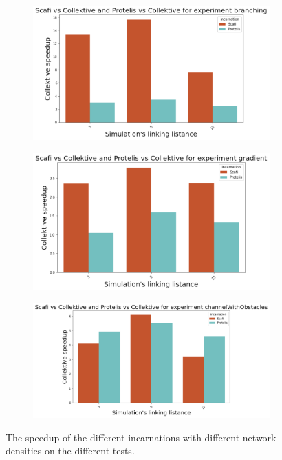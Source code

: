 \begin{figure}[ht!]
\begin{subfigure}[b]{0.49\textwidth}
        \centering
        \includegraphics[width=\textwidth]{figures/branching-speedup}
    \end{subfigure}
    \begin{subfigure}[b]{0.49\textwidth}
        \centering
        \includegraphics[width=\textwidth]{figures/gradient-speedup}
    \end{subfigure}
    \begin{subfigure}[b]{0.6\textwidth}
        \centering
        \includegraphics[width=\textwidth]{figures/channel-speedup}
    \end{subfigure}
    \caption{The speedup of the different incarnations with different network densities on the different tests.}
    \label{fig:speedup}
\end{figure}

